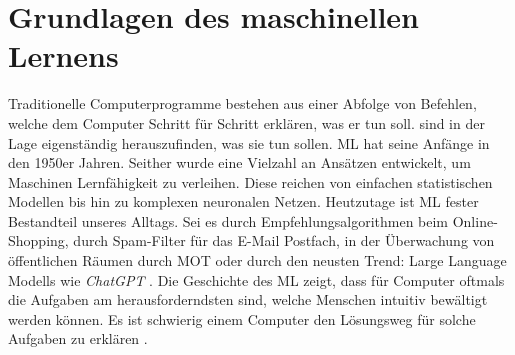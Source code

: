 \section{Grundlagen des maschinellen Lernens} \label{sec:Grundlagen ML}
Traditionelle Computerprogramme bestehen aus einer Abfolge von Befehlen, welche dem Computer Schritt für Schritt erklären, was er tun soll.  sind in der Lage eigenständig herauszufinden, was sie tun sollen. \Gls{ML} hat seine Anfänge in den 1950er Jahren. Seither wurde eine Vielzahl an Ansätzen entwickelt, um Maschinen Lernfähigkeit zu verleihen. Diese reichen von einfachen statistischen Modellen bis hin zu komplexen neuronalen Netzen. Heutzutage ist \gls{ML} fester Bestandteil unseres Alltags. Sei es durch Empfehlungsalgorithmen beim Online-Shopping, durch Spam-Filter für das E-Mail Postfach, in der Überwachung von öffentlichen Räumen durch \gls{MOT} oder durch den neusten Trend: Large Language Modells wie \textit{ChatGPT} \cite{Domingos.2015, Liu.2023}. Die Geschichte des \gls{ML} zeigt, dass für Computer oftmals die Aufgaben am herausforderndsten sind, welche Menschen intuitiv bewältigt werden können. Es ist schwierig einem Computer den Lösungsweg für solche Aufgaben zu erklären \cite{Goodfellow.2016}. \par

